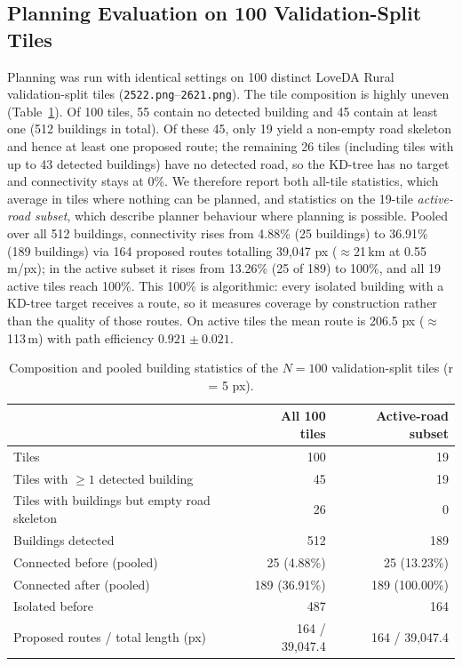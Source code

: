 \documentclass[runningheads]{llncs}
\begin{document}
\subsection{Planning Evaluation on 100 Validation-Split Tiles}
Planning was run with identical settings on 100 distinct LoveDA Rural validation-split tiles (\texttt{2522.png}--\texttt{2621.png}). The tile composition is highly uneven (Table~\ref{tab:pool}). Of 100 tiles, 55 contain no detected building and 45 contain at least one (512 buildings in total). Of these 45, only 19 yield a non-empty road skeleton and hence at least one proposed route; the remaining 26 tiles (including tiles with up to 43 detected buildings) have no detected road, so the KD-tree has no target and connectivity stays at 0\%. We therefore report both all-tile statistics, which average in tiles where nothing can be planned, and statistics on the 19-tile \emph{active-road subset}, which describe planner behaviour where planning is possible. Pooled over all 512 buildings, connectivity rises from 4.88\% (25 buildings) to 36.91\% (189 buildings) via 164 proposed routes totalling 39,047 px ($\approx$21\,km at 0.55\,m/px); in the active subset it rises from 13.26\% (25 of 189) to 100\%, and all 19 active tiles reach 100\%. This 100\% is algorithmic: every isolated building with a KD-tree target receives a route, so it measures coverage by construction rather than the quality of those routes. On active tiles the mean route is 206.5 px ($\approx$113\,m) with path efficiency $0.921\pm0.021$.

\begin{table}[t]
\caption{Composition and pooled building statistics of the $N=100$ validation-split tiles (r = 5 px).}\label{tab:pool}
\centering
\begin{tabular}{lrr}
\toprule
 & All 100 tiles & Active-road subset\\
\midrule
Tiles & 100 & 19\\
Tiles with $\ge1$ detected building & 45 & 19\\
Tiles with buildings but empty road skeleton & 26 & 0\\
Buildings detected & 512 & 189\\
Connected before (pooled) & 25 (4.88\%) & 25 (13.23\%)\\
Connected after (pooled) & 189 (36.91\%) & 189 (100.00\%)\\
Isolated before & 487 & 164\\
Proposed routes / total length (px) & 164 / 39,047.4 & 164 / 39,047.4\\
\bottomrule
\end{tabular}
\end{table}
\end{document}
